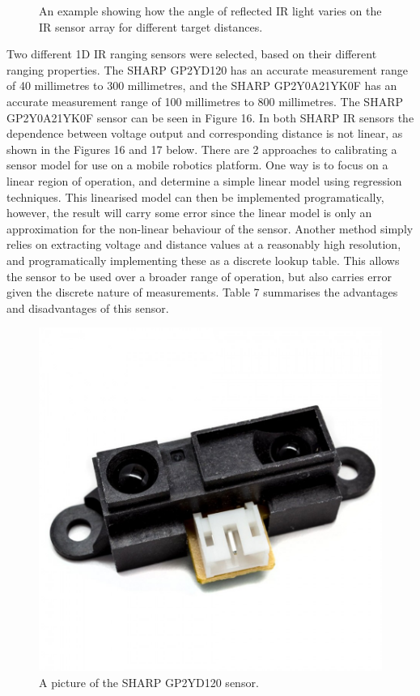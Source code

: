 \documentclass[a4paper]{article}
\begin{document}
\begin{figure}[h]
\begin{minipage}[t]{0.45\textwidth}
\caption{An example showing how the angle of reflected IR light varies on the IR sensor array for different target distances.}
\end{minipage}
\end{figure}

Two different 1D IR ranging sensors were selected, based on their different ranging properties. The SHARP GP2YD120 has an accurate measurement range of 40 millimetres to 300 millimetres, and the SHARP GP2Y0A21YK0F has an accurate measurement range of 100 millimetres to 800 millimetres. The SHARP GP2Y0A21YK0F sensor can be seen in Figure 16. In both SHARP IR sensors the dependence between voltage output and corresponding distance is not linear, as shown in the Figures 16 and 17 below. There are 2 approaches to calibrating a sensor model for use on a mobile robotics platform. One way is to focus on a linear region of operation, and determine a simple linear model using regression techniques. This linearised model can then be implemented programatically, however, the result will carry some error since the linear model is only an approximation for the non-linear behaviour of the sensor. Another method simply relies on extracting voltage and distance values at a reasonably high resolution, and programatically implementing these as a discrete lookup table. This allows the sensor to be used over a broader range of operation, but also carries error given the discrete nature of measurements. Table 7 summarises the advantages and disadvantages of this sensor.
\vspace{-2cm}
\begin{figure}
\centering
\includegraphics[scale=0.08]{sharp_sensor}
\caption{A picture of the SHARP GP2YD120 sensor.}
\end{figure}
\end{document}
